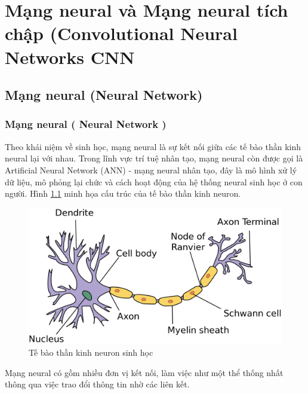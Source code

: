 \chapter{Mạng neural và Mạng neural tích chập (Convolutional Neural Networks CNN}

\section{Mạng neural (Neural Network)}

\subsection{Mạng neural ( Neural Network )}
	
	
	Theo khái niệm về sinh học, mạng neural là sự kết nối giữa các tế bào thần kinh neural lại với nhau. Trong lĩnh vực trí tuệ nhân tạo, mạng neural còn được gọi là Artificial Neural Network (ANN) - mạng neural nhân tạo, đây là mô hình xử lý dữ liệu, mô phỏng lại chức và cách hoạt động của hệ thống neural sinh học ở con người. Hình \ref{fig:neuron} minh họa cấu trúc của tế bào thần kinh neuron.
	
	\begin{figure}[h!]
		\centering
		\includegraphics[scale=0.18]{charts/neuron.png}
		\caption{Tế bào thần kinh neuron sinh học \cite{img-neuron}}
		\label{fig:neuron}
	\end{figure}
	
	Mạng neural có gồm nhiều đơn vị kết nối, làm việc như một thể thống nhất thông qua việc trao đổi thông tin nhờ các liên kết.
	
